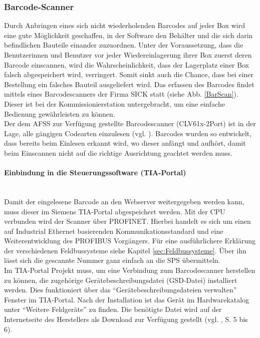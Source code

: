 \subsubsection{Barcode-Scanner} \label{sec:Barcodescanner}
Durch Anbringen eines sich nicht wiederholenden Barcodes auf jeder Box wird eine gute Möglichkeit geschaffen, in der Software den Behälter und die sich darin befindlichen Bauteile einander zuzuordnen. Unter der Voraussetzung, dass die Benutzerinnen und Benutzer vor jeder Wiedereinlagerung ihrer Box zuerst deren Barcode einscannen, wird die Wahrscheinlichkeit, dass der Lagerplatz einer Box falsch abgespeichert wird, verringert. Somit sinkt auch die Chance, dass bei einer Bestellung ein falsches Bauteil ausgeliefert wird. Das erfassen des Barcodes findet mittels eines Barcodescanners der Firma SICK statt (siehe Abb. \ref{BarScan}). Dieser ist bei der Kommissionierstation untergebracht, um eine einfache Bedienung gewährleisten zu können.\\
Der dem AFSS zur Verfügung gestellte Barcodescanner (CLV61x-2Port) ist in der Lage, alle gängigen Codearten einzulesen (vgl. \cite{Barcodescanner}). Barcodes wurden so entwickelt, dass bereits beim Einlesen erkannt wird, wo dieser anfängt und aufhört, damit beim Einscannen nicht auf die richtige Ausrichtung geachtet werden muss.

\paragraph{Einbindung in die Steuerungssoftware (TIA-Portal)}\mbox{}\\
Damit der eingelesene Barcode an den Webserver weitergegeben werden kann, muss dieser im Siemens TIA-Portal abgespeichert werden. Mit der CPU verbunden wird der Scanner über PROFINET. Hierbei handelt es sich um einen auf Industrial Ethernet basierenden Kommunikationsstandard und eine Weiterentwicklung des PROFIBUS Vorgängers. Für eine ausführlichere Erklärung der verschiedenen Feldbussysteme siehe Kapitel \ref{sec:Feldbussysteme}. Über ihn lässt sich die gescannte Nummer ganz einfach an die SPS übermitteln.\\
Im TIA-Portal Projekt muss, um eine Verbindung zum Barcodescanner herstellen zu können, die zugehörige Gerätebeschreibungsdatei (GSD-Datei) installiert werden. Dies funktioniert über das \enquote{Gerätebeschreibungsdateien verwalten} Fenster im TIA-Portal. Nach der Installation ist das Gerät im Hardwarekatalog unter \enquote{Weitere Feldgeräte} zu finden. Die benötigte Datei wird auf der Internetseite des Herstellers als Download zur Verfügung gestellt (vgl. \cite{BarScan_Handbuch}, S. 5 bis 6).

